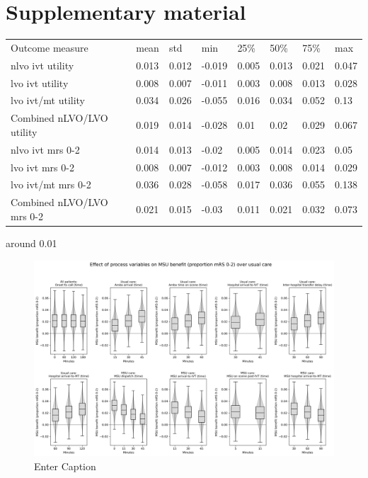 \section{Supplementary material}





\begin{minipage}{1.0\linewidth}
\begin{tabular}{llllllll}
Outcome measure           & mean  & std   & min    & 25\%  & 50\%  & 75\%  & max   \\
nlvo ivt utility          & 0.013 & 0.012 & -0.019 & 0.005 & 0.013 & 0.021 & 0.047 \\
lvo ivt utility           & 0.008 & 0.007 & -0.011 & 0.003 & 0.008 & 0.013 & 0.028 \\
lvo ivt/mt utility        & 0.034 & 0.026 & -0.055 & 0.016 & 0.034 & 0.052 & 0.13  \\
Combined nLVO/LVO utility & 0.019 & 0.014 & -0.028 & 0.01  & 0.02  & 0.029 & 0.067 \\
nlvo ivt mrs 0-2          & 0.014 & 0.013 & -0.02  & 0.005 & 0.014 & 0.023 & 0.05  \\
lvo ivt mrs 0-2           & 0.008 & 0.007 & -0.012 & 0.003 & 0.008 & 0.014 & 0.029 \\
lvo ivt/mt mrs 0-2        & 0.036 & 0.028 & -0.058 & 0.017 & 0.036 & 0.055 & 0.138 \\
Combined nLVO/LVO mrs 0-2 & 0.021 & 0.015 & -0.03  & 0.011 & 0.021 & 0.032 & 0.073
\end{tabular}
\end{minipage}around 0.01

\begin{figure}
    \centering
    \includegraphics[width=1\linewidth]{images/msu_net_mrs_0-2_benefit.png}
    \caption{Enter Caption}
    \label{fig:enter-label}
\end{figure}

